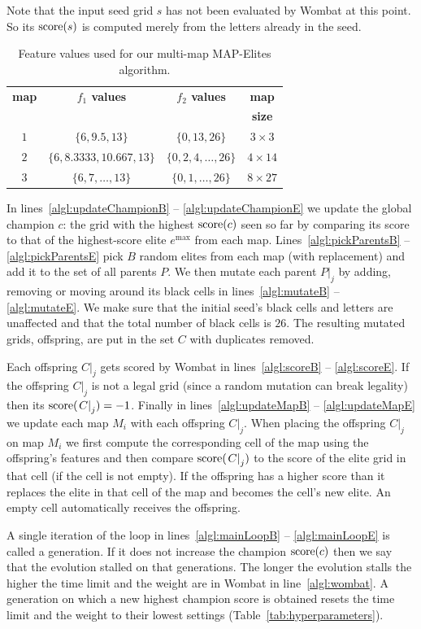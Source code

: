Note that the input seed grid $s$ has not been evaluated by {\sc Wombat} at this point. So its $\operatorname{score}(s)$ is computed merely from the letters already in the seed.

\begin{table}[htbp]
\caption{Feature values used for our multi-map MAP-Elites algorithm.}
\label{tab:mrme}
{\small\centering
\begin{tabular}{c|c|c|c}
\toprule
{\bf map} & {\bf $f_1$ values} & {\bf $f_2$ values} & {\bf map} \\
          &                    &                    & {\bf size} \\
\midrule
$1$ & $\{6,9.5,13\}$ & $\{0,13,26\}$ & $3 \times 3$ \\
$2$ & $\{6,8.3333,10.667,13\}$ & $\{0,2,4,\dots,26\}$ & $4 \times 14$\\
$3$ & $\{6,7,\dots,13\}$ & $\{0,1,\dots,26\}$ & $8 \times 27$\\
\bottomrule
\end{tabular}}
\end{table}

In lines~\ref{algl:updateChampionB} -- \ref{algl:updateChampionE} we update the global champion $c$: the grid with the highest $\operatorname{score}(c)$ seen so far by comparing its score to that of the highest-score elite $e^{\max}$ from each map. Lines~\ref{algl:pickParentsB} -- \ref{algl:pickParentsE} pick $B$ random elites from each map (with replacement) and add it to the set of all parents $P$. We then mutate each parent $\left.P\right|_j$ by adding, removing or moving around its black cells in lines~\ref{algl:mutateB} -- \ref{algl:mutateE}. We make sure that the initial seed's black cells and letters are unaffected and that the total number of black cells is $26$. The resulting mutated grids, offspring, are put in the set $C$ with duplicates removed.

Each offspring $\left.C\right|_j$ gets scored by {\sc Wombat} in lines~\ref{algl:scoreB} -- \ref{algl:scoreE}. If the offspring $\left.C\right|_j$ is not a legal grid (since a random mutation can break legality) then its $\operatorname{score}(\left.C\right|_j) = -1$. Finally in lines~\ref{algl:updateMapB} -- \ref{algl:updateMapE} we update each map $M_i$ with each offspring $\left.C\right|_j$. When placing the offspring $\left.C\right|_j$ on map $M_i$ we first compute the corresponding cell of the map using the offspring's features and then compare $\operatorname{score}(\left.C\right|_j)$ to the score of the elite grid in that cell (if the cell is not empty). If the offspring has a higher score than it replaces the elite in that cell of the map and becomes the cell's new elite. An empty cell automatically receives the offspring.

A single iteration of the loop in lines~\ref{algl:mainLoopB} -- \ref{algl:mainLoopE} is called a generation. If it does not increase the champion $\operatorname{score}(c)$ then we say that the evolution stalled on that generations. The longer the evolution stalls the higher the time limit and the weight are in {\sc Wombat} in line~\ref{algl:wombat}. A generation on which a new highest champion score is obtained resets the time limit and the weight to their lowest settings (Table~\ref{tab:hyperparameters}).
